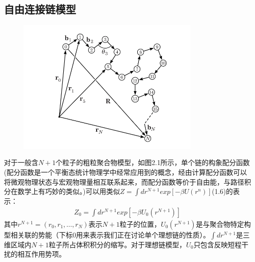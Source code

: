 \subsection{自由连接链模型}
\begin{figure}
				\caption{ }
				\centering
				\includegraphics[width=9cm]{./figures/2-1.png}
			\end{figure}
对于一般含$N+1$个粒子的粗粒聚合物模型，如图2.1所示，单个链的构象配分函数(配分函数是一个平衡态统计物理学中经常应用到的概念，经由计算配分函数可以将微观物理状态与宏观物理量相互联系起来，而配分函数等价于自由能，与路径积分在数学上有巧妙的类似。)可以用类似$Z=\int dr^{N+1}exp[-\beta U(r^{n})]$(1.6)的表示：\\
\begin{gather}
Z_0 = \int dr^{N+1}exp[-\beta U_{0}(r^{N+1})]
\end{gather}
其中$r^{N+1}=(r_0,r_1,\ldots,r_{N})$表示$N+1$粒子的位置，$U_0(r^{N+1})$是与聚合物特定构型相关联的势能（下标$0$用来表示我们正在讨论单个理想链的性质）。$\int dr^{N+1}$是三维区域内$N+1$粒子所占体积积分的缩写。对于理想链模型，$U_0$只包含反映短程干扰的相互作用势项。\\

